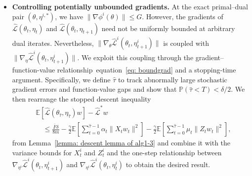 \documentclass[twoside]{article} %
\def\eqref#1{equation~\ref{#1}}
\theoremstyle{plain}
\theoremstyle{definition}
\theoremstyle{remark}
\newcommand{\hL}{\hat{L}}
\newcommand{\htau}{\hat{\tau}}
\newcommand{\fhL}{\hat{\mathcal{L}}}
\begin{document}
\begin{itemize}[leftmargin = *, topsep = 0pt]
error terms from being uniformly controlled at the
$\mathcal{O}(\gamma\epsilon^2)$ level in~\eqref{eq: general analysis framework}.
\item \textbf{Controlling potentially unbounded gradients.}
At the exact primal--dual pair
$(\theta,\eta^{i,*})$, we have $\|\nabla\phi^i(\theta)\|\leq G$. However, the gradients of
$\fhL(\theta_t,\eta_t)$ and $\fhL(\theta_t,\eta_{t+1})$ need not be uniformly
bounded at arbitrary dual iterates. Nevertheless,
$\|\nabla_{\theta}\fhL^i(\theta_t,\eta^i_{t+1})\|$ is coupled with
$\|\nabla_{\eta}\fhL^i(\theta_t,\eta^i_{t+1})\|$. We exploit this coupling through the
gradient--function-value relationship~\eqref{eq: boundgrad} and a stopping-time
argument. Specifically, we define $\htau$ to track abnormally large stochastic
gradient errors and function-value gaps and show that
$\mathbb{P}(\htau<T)<\delta/2$. We then rearrange the stopped descent inequality
\begin{align}
&\mathbb{E}[\fhL(\theta_{\htau},\eta_{\htau})w]-\fhL^*w\nonumber\\
&\quad\leq \frac{\bar F\delta}{8m}
-\frac{\gamma}{2}\mathbb{E}[\sum_{t=0}^{\htau-1}
\alpha_t\|X_tw_t\|^2]
-\frac{\gamma}{2}\mathbb{E}[\sum_{t=0}^{\htau-1}
\mu_t\|Z_tw_t\|^2],\nonumber
\end{align}
from Lemma~\ref{lemma: descent lemma of alg1-3} and combine it with the variance
bounds for $X_t^i$ and $Z_t^i$ and the one-step relationship between
$\nabla_{\eta^i}\fhL^i(\theta_t,\eta^i_{t+1})$ and
$\nabla_{\eta^i}\fhL^i(\theta_t,\eta^i_t)$ to obtain the desired result.
 
\end{itemize}
\end{document}
